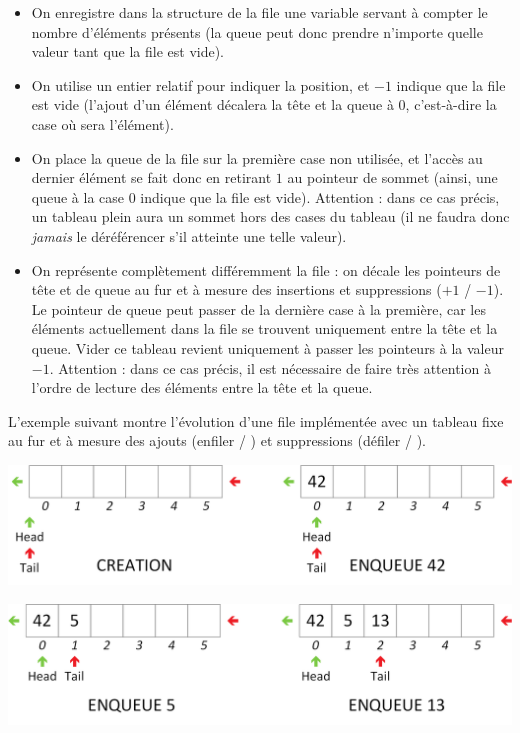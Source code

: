 \documentclass[11pt,a4paper]{article}
\begin{document}
\begin{itemize}
\item On enregistre dans la structure de la file une variable servant à compter le nombre d'éléments présents (la queue peut donc prendre n'importe quelle valeur tant que la file est vide).
\item On utilise un entier relatif pour indiquer la position, et $ -1 $ indique que la file est vide (l'ajout d'un élément décalera la tête et la queue à $ 0 $, c'est-à-dire la case où sera l'élément).
\item On place la queue de la file sur la première case non utilisée, et l'accès au dernier élément se fait donc en retirant $ 1 $ au pointeur de sommet (ainsi, une queue à la case $ 0 $ indique que la file est vide).
Attention : dans ce cas précis, un tableau plein aura un sommet hors des cases du tableau (il ne faudra donc \textit{jamais} le déréférencer s'il atteinte une telle valeur).
\item On représente complètement différemment la file : on décale les pointeurs de tête et de queue au fur et à mesure des insertions et suppressions ($ +1 $ / $ -1 $). Le pointeur de queue peut passer de la dernière case à la première, car les éléments actuellement dans la file se trouvent uniquement entre la tête et la queue.
Vider ce tableau revient uniquement à passer les pointeurs à la valeur $ -1 $.
Attention : dans ce cas précis, il est nécessaire de faire très attention à l'ordre de lecture des éléments entre la tête et la queue.
\end{itemize}

\smallskip

L'exemple suivant montre l'évolution d'une file implémentée avec un tableau fixe au fur et à mesure des ajouts (enfiler / ) et suppressions (défiler / ).\\

\begin{center}
\includegraphics[scale=0.65]{img/files/Files_6_Tableau_Statique_Usage_pack_1.png}
\end{center}

\begin{center}
\includegraphics[scale=0.65]{img/files/Files_6_Tableau_Statique_Usage_pack_2.png}
\end{center}
\end{document}
